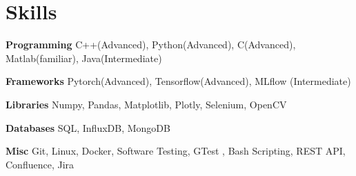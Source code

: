 
\section{Skills}
  \vspace{2pt}
  \resumeSubHeadingListStart
    \small{\item{

    \textbf{\color{MidnightBlue}Programming}{ C++(Advanced), Python(Advanced), C(Advanced), Matlab(familiar), Java(Intermediate)} \\ \vspace{3pt}

    \textbf{\color{MidnightBlue}Frameworks}{ Pytorch(Advanced), Tensorflow(Advanced), MLflow (Intermediate)}\\ \vspace{3pt} %

    \textbf{\color{MidnightBlue}Libraries}{ Numpy, Pandas, Matplotlib, Plotly, Selenium, OpenCV} \\ \vspace{3pt}


    \textbf{\color{MidnightBlue}Databases}{ SQL, InfluxDB, MongoDB} \\ \vspace{3pt}

    \textbf{\color{MidnightBlue}Misc}{ Git, Linux, Docker, Software Testing, GTest , Bash Scripting, REST API, Confluence, Jira} \\ \vspace{3pt}
            
    }}
  \resumeSubHeadingListEnd

